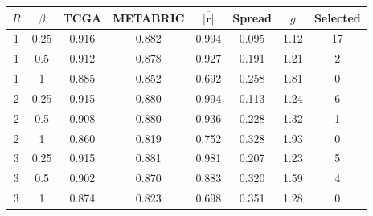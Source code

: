 \begin{tabular}{cccccccc}
\toprule
$R$ & $\beta$ & TCGA & METABRIC & $\overline{|\mathbf{r}|}$ & Spread & $g$ & Selected \\
\midrule
1 & 0.25 & 0.916 & 0.882 & 0.994 & 0.095 & 1.12 & 17 \\
1 & 0.5 & 0.912 & 0.878 & 0.927 & 0.191 & 1.21 & 2 \\
1 & 1 & 0.885 & 0.852 & 0.692 & 0.258 & 1.81 & 0 \\
2 & 0.25 & 0.915 & 0.880 & 0.994 & 0.113 & 1.24 & 6 \\
2 & 0.5 & 0.908 & 0.880 & 0.936 & 0.228 & 1.32 & 1 \\
2 & 1 & 0.860 & 0.819 & 0.752 & 0.328 & 1.93 & 0 \\
3 & 0.25 & 0.915 & 0.881 & 0.981 & 0.207 & 1.23 & 5 \\
3 & 0.5 & 0.902 & 0.870 & 0.883 & 0.320 & 1.59 & 4 \\
3 & 1 & 0.874 & 0.823 & 0.698 & 0.351 & 1.28 & 0 \\
\bottomrule
\end{tabular}
